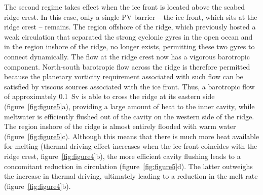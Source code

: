 \documentclass[draft]{agujournal2019}
\begin{document}
The second regime takes effect when the ice front is located above the seabed ridge crest. In this case, only a single PV barrier -- the ice front, which sits at the ridge crest -- remains. The region offshore of the ridge, which previously hosted a weak circulation that separated the strong cyclonic gyres in the open ocean and in the region inshore of the ridge, no longer exists, permitting these two gyres to connect dynamically. The flow at the ridge crest now has a vigorous barotropic component. North-south barotropic flow across the ridge is therefore permitted because the planetary vorticity requirement associated with such flow can be satisfied by viscous sources associated with the ice front. Thus, a barotropic flow of approximately 0.1~Sv is able to cross the ridge at its eastern side (figure~\ref{fig:figure5}a), providing a large amount of heat to the inner cavity, while meltwater is efficiently flushed out of the cavity on the western side of the ridge. The region inshore of the ridge is almost entirely flooded with warm water (figure~\ref{fig:figure5}c). Although this means that there is much more heat available for melting (thermal driving effect increases when the ice front coincides with the ridge crest, figure~\ref{fig:figure4}b), the more efficient cavity flushing leads to a concomitant reduction in circulation (figure~\ref{fig:figure5}d). The latter outweighs the increase in thermal driving, ultimately leading to a reduction in the melt rate (figure~\ref{fig:figure4}b).

\end{document}
